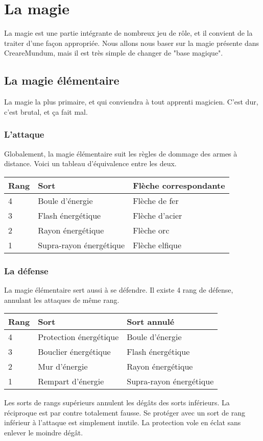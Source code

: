 \section{La magie}
La magie est une partie intégrante de nombreux jeu de rôle, et il convient de la traiter d'une façon appropriée.
Nous allons nous baser sur la magie présente dans CreareMundum, mais il est très simple de changer de "base magique".

\subsection{La magie élémentaire}
La magie la plus primaire, et qui conviendra à tout apprenti magicien. C'est dur, c'est brutal, et ça fait mal.
\subsubsection{L'attaque}
Globalement, la magie élémentaire suit les règles de dommage des armes à distance. Voici un tableau d'équivalence entre les deux.
\newline
\newline
\begin{tabular}{l|l|l}
   Rang & Sort & Flèche correspondante \\
   \hline
   4 & Boule d'énergie & Flèche de fer \\
   3 & Flash énergétique & Flèche d'acier \\
   2 & Rayon énergétique & Flèche orc \\
   1 & Supra-rayon énergétique & Flèche elfique \\
\end{tabular}
\newline
\subsubsection{La défense}
La magie élémentaire sert aussi à se défendre. Il existe 4 rang de défense, annulant les attaques de même rang.
\newline
\newline
\begin{tabular}{l|l|l}
   Rang & Sort & Sort annulé \\
   \hline
   4 & Protection énergétique  & Boule d'énergie \\
   3 & Bouclier énergétique  & Flash énergétique \\
   2 & Mur d'énergie & Rayon énergétique \\
   1 & Rempart d'énergie & Supra-rayon énergétique \\
\end{tabular}
\newline
\newline
Les sorts de rangs supérieurs annulent les dégâts des sorts inférieurs. La réciproque est par contre totalement fausse. Se protéger avec un sort de rang inférieur à l'attaque est simplement inutile. La protection vole en éclat sans enlever le moindre dégât. 